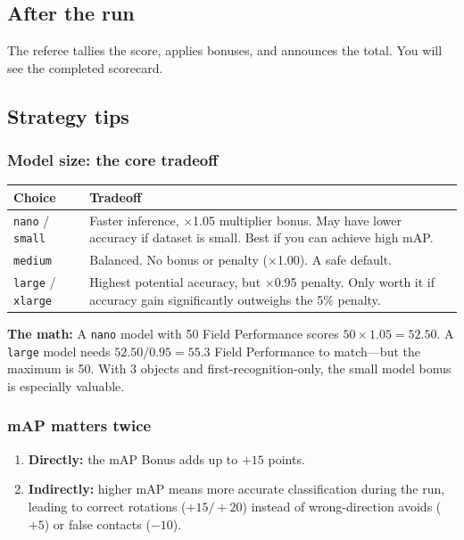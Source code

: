 \documentclass[a4]{article}
\begin{document}
\subsection*{After the run}

The referee tallies the score, applies bonuses, and announces the total. You will see the completed scorecard.

\pagebreak
\subsection*{Strategy tips}

\subsubsection*{Model size: the core tradeoff}

\begin{table}[H]
\centering
\begin{tabular}{lp{10cm}}
\toprule
\textbf{Choice} & \textbf{Tradeoff} \\
\midrule
\texttt{nano} / \texttt{small} & Faster inference, $\times$1.05 multiplier bonus. May have lower accuracy if dataset is small. Best if you can achieve high mAP. \\
\addlinespace
\texttt{medium} & Balanced. No bonus or penalty ($\times$1.00). A safe default. \\
\addlinespace
\texttt{large} / \texttt{xlarge} & Highest potential accuracy, but $\times$0.95 penalty. Only worth it if accuracy gain significantly outweighs the 5\% penalty. \\
\bottomrule
\end{tabular}
\end{table}

\textbf{The math:} A \texttt{nano} model with 50 Field Performance scores $50 \times 1.05 = 52.50$. A \texttt{large} model needs $52.50 / 0.95 = 55.3$ Field Performance to match---but the maximum is 50. With 3 objects and first-recognition-only, the small model bonus is especially valuable.

\subsubsection*{mAP matters twice}

\begin{enumerate}
    \item \textbf{Directly:} the mAP Bonus adds up to $+15$ points.
    \item \textbf{Indirectly:} higher mAP means more accurate classification during the run, leading to correct rotations ($+15/+20$) instead of wrong-direction avoids ($+5$) or false contacts ($-10$).
\end{enumerate}
\end{document}
